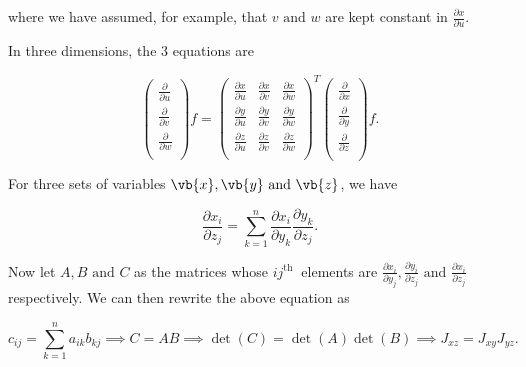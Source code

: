 \documentclass[english,a4paper,12pt]{report}
\begin{document}
where we have assumed, for example, that \(v \text { and } w\) are kept constant in \(\frac{\partial x}{\partial u} \).  

In three dimensions, the 3 equations are

\begin{equation} \label{jacobderi} 
	\begin{pmatrix}
		 \frac{\partial }{\partial u }  \\
		 \frac{\partial }{\partial v }  \\
		 \frac{\partial }{\partial w }  \\
	\end{pmatrix} f = \begin{pmatrix}
		\frac{\partial x}{\partial u}  & \frac{\partial x}{\partial v}  & \frac{\partial x}{\partial w}   \\
		\frac{\partial y}{\partial u}  & \frac{\partial y}{\partial v}  & \frac{\partial y}{\partial w}   \\
		\frac{\partial z}{\partial u}  & \frac{\partial z}{\partial v}  & \frac{\partial z}{\partial w}   \\
	\end{pmatrix}^T \begin{pmatrix}
		\frac{\partial }{\partial x }  \\
		\frac{\partial }{\partial y }  \\
		\frac{\partial }{\partial z }  \\
   \end{pmatrix} f.
\end{equation} 

For three sets of variables \(\vb{x} ,\vb{y} \text { and } \vb{z} \), we have

\begin{equation}
	\frac{\partial x_{i} }{\partial z_{j} } = \sum_{k=1}^{n} \frac{\partial x_{i} }{\partial y_{k} } \frac{\partial y_{k} }{\partial z_{j} }.   
\end{equation}

Now let \(A, B \text { and } C\) as the matrices whose \(ij^{\text{th }} \) elements are \(\displaystyle \frac{\partial x_{i} }{\partial y_{j} }, \frac{\partial y_{i} }{\partial z_{j} } \text { and } \frac{\partial x_{i} }{\partial z_{j} }\) respectively. We can then rewrite the above equation as 

\begin{equation}
	c_{ij} = \sum_{k=1}^{n} a_{ik}b_{kj} \implies C = AB \implies \det (C) = \det (A) \det (B) \implies J_{xz} = J_{xy} J_{yz}.   
\end{equation}
\end{document}
